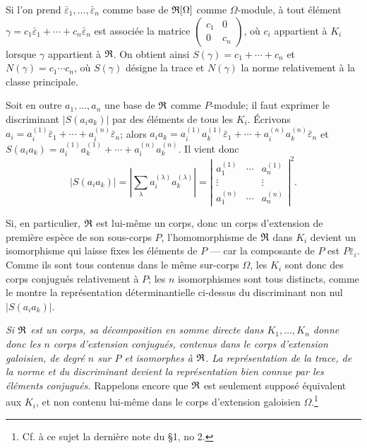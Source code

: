 Si l'on prend $\bar\varepsilon_1,\ldots,\bar\varepsilon_n$ comme base de $\mathfrak R[\Omega]$ comme $\Omega$-module, à tout élément
$\gamma=c_1\bar\varepsilon_1+\cdots+c_n\bar\varepsilon_n$
est associée la matrice
$\left(\begin{smallmatrix}c_1&0\\0&c_n\end{smallmatrix}\right)$,
où $c_i$ appartient à $K_i$ lorsque $\gamma$ appartient à $\mathfrak R$. On obtient ainsi
$S(\gamma)=c_1+\cdots+c_n$ et $N(\gamma)=c_1\cdots c_n$,
où $S(\gamma)$ désigne la trace et $N(\gamma)$ la norme relativement à la classe principale.

Soit en outre $a_1,\ldots,a_n$ une base de $\mathfrak R$ comme $P$-module; il faut exprimer le discriminant $|S(a_i a_k)|$ par des éléments de tous les $K_i$. Écrivons
$a_i=a_i^{(1)}\bar\varepsilon_1+\cdots+a_i^{(n)}\bar\varepsilon_n$;
alors
$a_i a_k=a_i^{(1)}a_k^{(1)}\bar\varepsilon_1+\cdots+a_i^{(n)}a_k^{(n)}\bar\varepsilon_n$
et
$S(a_i a_k)=a_i^{(1)}a_k^{(1)}+\cdots+a_i^{(n)}a_k^{(n)}$.
Il vient donc
\[
\left|S(a_i a_k)\right|
=
\left|\sum_{\lambda}a_i^{(\lambda)}a_k^{(\lambda)}\right|
=
\left|
\begin{matrix}
 a_1^{(1)}&\cdots&a_n^{(1)}\\
 \vdots&&\vdots\\
 a_1^{(n)}&\cdots&a_n^{(n)}
\end{matrix}
\right|^2.
\]

Si, en particulier, $\mathfrak R$ est lui-même un corps, donc un corps d'extension de première espèce de son sous-corps $P$, l'homomorphisme de $\mathfrak R$ dans $K_i$ devient un isomorphisme qui laisse fixes les éléments de $P$ --- car la composante de $P$ est $P\bar\varepsilon_i$. Comme ils sont tous contenus dans le même sur-corps $\Omega$, les $K_i$ sont donc des corps conjugués relativement à $P$; les $n$ isomorphismes sont tous distincts, comme le montre la représentation déterminantielle ci-dessus du discriminant non nul $|S(a_i a_k)|$.

\emph{Si $\mathfrak R$ est un corps, sa décomposition en somme directe dans $K_1,\ldots,K_n$ donne donc les $n$ corps d'extension conjugués, contenus dans le corps d'extension galoisien, de degré $n$ sur $P$ et isomorphes à $\mathfrak R$. La représentation de la trace, de la norme et du discriminant devient la représentation bien connue par les éléments conjugués.} Rappelons encore que $\mathfrak R$ est seulement supposé équivalent aux $K_i$, et non contenu lui-même dans le corps d'extension galoisien $\Omega$.\footnote{Cf. à ce sujet la dernière note du \S 1, no 2.}

